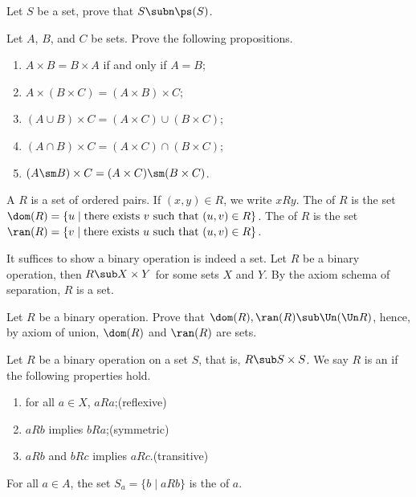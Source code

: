 \documentclass[10pt]{article}
\begin{document}
\begin{problem}
    Let $S$ be a set, prove that $S\subn\ps(S)$. 
\end{problem}
\begin{problem}
    Let $A$, $B$, and $C$ be sets. Prove the following propositions.
    \begin{enumerate}
        \item $A\times B=B\times A$ if and only if $A=B$;
        \item $A\times(B\times C)=(A\times B)\times C$;
        \item $(A\cup B)\times C=(A\times C)\cup(B\times C)$;
        \item $(A\cap B)\times C=(A\times C)\cap(B\times C)$;
        \item $(A\sm B)\times C=(A\times C)\sm(B\times C)$.
    \end{enumerate}
\end{problem}
\begin{definition}
    A  $R$ is a set of ordered pairs. If $(x,y)\in R$, we write $xRy$. The  of $R$ is the set $\dom(R)=\{u\mid\text{there exists}\ v\ \text{such that}\ (u,v)\in R\}$. The  of $R$ is the set $\ran(R)=\{v\mid\text{there exists}\ u\ \text{such that}\ (u,v)\in R\}$. 
\end{definition}
\par
It suffices to show a binary operation is indeed a set. Let $R$ be a binary operation, then $R\sub X\times Y$ for some sets $X$ and $Y$. By the axiom schema of separation, $R$ is a set. 
\begin{problem}
    Let $R$ be a binary operation. Prove that $\dom(R),\ran(R)\sub\Un(\Un R)$, hence, by axiom of union, $\dom(R)$ and $\ran(R)$ are sets.
\end{problem}
\begin{definition}
    Let $R$ be a binary operation on a set $S$, that is, $R\sub S\times S$. We say $R$ is an  if the following properties hold.
    \begin{enumerate}
        \item for all $a\in X$, $aRa$;\hfill(reflexive)
        \item $aRb$ implies $bRa$;\hfill(symmetric)
        \item $aRb$ and $bRc$ implies $aRc$.\hfill(transitive)
    \end{enumerate}
    For all $a\in A$, the set ${S}_{a}=\{b\mid aRb\}$ is the  of $a$. 
\end{definition}
\end{document}
